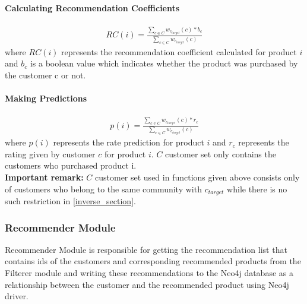 	\paragraph{Calculating Recommendation Coefficients}	
	\begin{equation*} 
	\begin{split}
	RC(i) = \frac{\sum_{c \in C}^{} w_{c_{target}}(c)*b_{c}}{\sum_{c \in C}^{} w_{c_{target}}(c)}
	\end{split}
	\end{equation*}
	where $RC(i)$ represents the recommendation coefficient calculated for product $i$ and $b_{c}$ is a boolean value which indicates whether the product was purchased by the customer c or not.


	\paragraph{Making Predictions}
	\begin{equation*} 
	\begin{split}
	p(i) = \frac{\sum_{c \in C}^{} w_{c_{target}}(c)*r_{c}}{\sum_{c \in C}^{} w_{c_{target}}(c)}
	\end{split}
	\end{equation*}
	where $p(i)$ represents the rate prediction for product $i$ and $r_{c}$ represents the rating given by customer $c$ for product $i$. $C$ customer set only contains the customers who purchased product i. \\
	
	\textbf{Important remark:} $C$ customer set used in functions given above consists only of customers who belong to the same community with $c_{target}$ while there is no such restriction in \ref{inverse_section}.

	\subsubsection{Recommender Module} Recommender Module is responsible for getting the recommendation list that contains ids of the customers and corresponding recommended products from the Filterer module and writing these recommendations to the Neo4j database as a relationship between the customer and the recommended product using Neo4j driver.